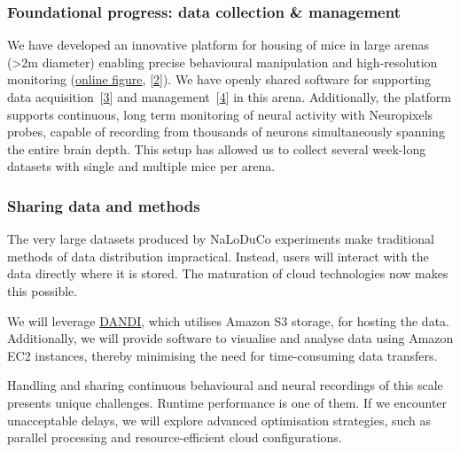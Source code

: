 \subsubsection{Foundational progress: data collection \& management}

We have developed an innovative platform for housing of mice in large arenas
(\textgreater 2m diameter) enabling precise behavioural manipulation and
high-resolution monitoring
(\href{https://www.gatsby.ucl.ac.uk/~rapela/bbsrc\_nsfbio/figures/foragingArena.png}{online
figure},
[\href{https://www.abstractsonline.com/pp8/?_gl=1*it0gi6*_gcl_au*MTUyNDE0NDQwLjE3Mjc2OTgyODM.*_ga*MTUxNDI2NDg5LjE3Mjc2OTgyODM.*_ga_T09K3Q2WDN*MTcyOTUwNDUzNy4yLjEuMTcyOTUwNDY3Ny41NC4wLjA.#!/20433/presentation/22271}{2}]).
%
We have openly shared software for supporting data
acquisition~[\href{https://github.com/SainsburyWellcomeCentre/aeon_acquisition}{3}]
and
management~[\href{https://github.com/SainsburyWellcomeCentre/aeon_mecha}{4}] in this
arena.
%
Additionally, the platform supports continuous, long term monitoring of neural
activity with Neuropixels probes, capable of recording from thousands of
neurons simultaneously spanning the entire brain depth.
%
This setup has allowed us to collect several week-long datasets with single and
multiple mice per arena.

%

\subsubsection{Sharing data and methods}

The very large datasets produced by NaLoDuCo experiments make traditional
methods of data distribution impractical. Instead, users will interact with the
data directly where it is stored. The maturation of cloud technologies now
makes this possible.

We will leverage \href{https://www.dandiarchive.org/}{DANDI}, which utilises
Amazon S3 storage, for hosting the data. Additionally, we will provide software
to visualise and analyse data using Amazon EC2 instances, thereby minimising
the need for time-consuming data transfers.

Handling and sharing continuous behavioural and neural recordings of this scale
presents unique challenges. Runtime performance is one of them. If we
encounter unacceptable delays, we will explore advanced optimisation
strategies, such as parallel processing and resource-efficient cloud
configurations.

